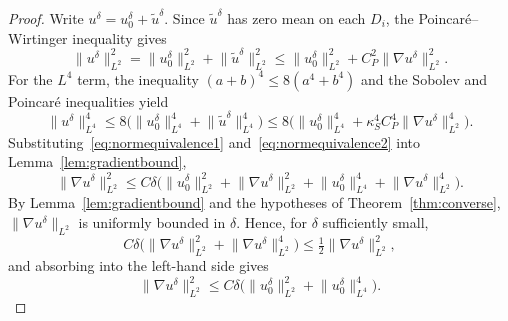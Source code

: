\documentclass[a4paper,reqno,twoside]{amsart}
\numberwithin{equation}{section}
\theoremstyle{definition}
\renewcommand{\tilde}{\widetilde}
\newcommand{\<}{\ensuremath \leq}
\renewcommand{\>}{\ensuremath \geq}
\renewcommand{\tilde}{\widetilde}
\begin{document}
\begin{proof}
    Write $u^\delta = u_0^\delta + \tilde{u}^\delta$. Since
    $\tilde{u}^\delta$ has zero mean on each $D_i$, the
    Poincar\'e--Wirtinger inequality gives
    \begin{equation}\label{eq:normequivalence1}
        \lVert u^\delta \rVert_{L^2}^2
        = \lVert u_0^\delta \rVert_{L^2}^2
          + \lVert \tilde{u}^\delta \rVert_{L^2}^2
        \leq \lVert u_0^\delta \rVert_{L^2}^2
          + C_P^2 \lVert \nabla u^\delta \rVert_{L^2}^2.
    \end{equation}
    For the $L^4$ term, the inequality
    $(a + b)^4 \leq 8(a^4 + b^4)$ and the Sobolev and Poincar\'e
    inequalities yield
    \begin{equation}\label{eq:normequivalence2}
        \lVert u^\delta \rVert_{L^4}^4
        \leq 8 \bigl(
          \lVert u_0^\delta \rVert_{L^4}^4
          + \lVert \tilde{u}^\delta \rVert_{L^4}^4
        \bigr)
        \leq 8 \bigl(
          \lVert u_0^\delta \rVert_{L^4}^4
          + \kappa_S^4 C_P^4
            \lVert \nabla u^\delta \rVert_{L^2}^4
        \bigr).
    \end{equation}
    Substituting~\eqref{eq:normequivalence1}
    and~\eqref{eq:normequivalence2} into
    Lemma~\ref{lem:gradientbound},
    \begin{equation}
        \lVert \nabla u^\delta \rVert_{L^2}^2
        \leq C \delta \bigl(
          \lVert u_0^\delta \rVert_{L^2}^2
          + \lVert \nabla u^\delta \rVert_{L^2}^2
          + \lVert u_0^\delta \rVert_{L^4}^4
          + \lVert \nabla u^\delta \rVert_{L^2}^4
        \bigr).
    \end{equation}
    By Lemma~\ref{lem:gradientbound} and the hypotheses of
    Theorem~\ref{thm:converse},
    $\lVert \nabla u^\delta \rVert_{L^2}$ is uniformly bounded in
    $\delta$. Hence, for $\delta$ sufficiently small,
    \begin{equation}
        C \delta \bigl(
          \lVert \nabla u^\delta \rVert_{L^2}^2
          + \lVert \nabla u^\delta \rVert_{L^2}^4
        \bigr)
        \leq \tfrac{1}{2}
          \lVert \nabla u^\delta \rVert_{L^2}^2,
    \end{equation}
    and absorbing into the left-hand side gives
    \begin{equation}\label{eq:gradient_in_a}
        \lVert \nabla u^\delta \rVert_{L^2}^2
        \leq C \delta \bigl(
          \lVert u_0^\delta \rVert_{L^2}^2
          + \lVert u_0^\delta \rVert_{L^4}^4
        \bigr).
    \end{equation}

\end{proof}
\end{document}
